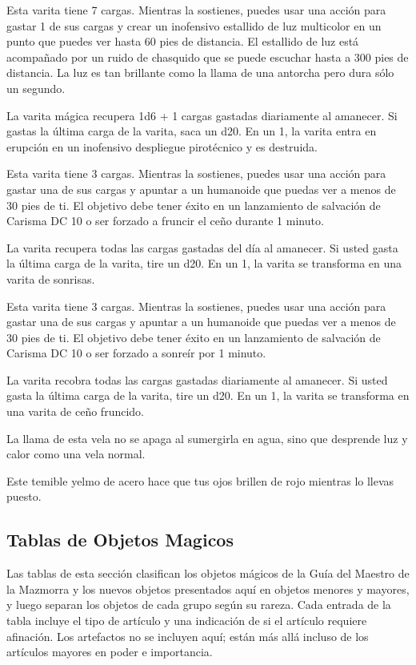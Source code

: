 \documentclass[a4paper,twocolumn,openany,10pt]{dndbook}
\begin{document}
Esta varita tiene 7 cargas. Mientras la sostienes, puedes usar una acción para gastar 1 de sus cargas y crear un inofensivo
estallido de luz multicolor en un punto que puedes ver hasta 60 pies de distancia. El estallido de luz está acompañado por un
ruido de chasquido que se puede escuchar hasta a 300 pies de distancia. La luz es tan brillante como la llama de una antorcha
pero dura sólo un segundo.

La varita mágica recupera 1d6 + 1 cargas gastadas diariamente al amanecer. Si gastas la última carga de la varita, saca un d20.
En un 1, la varita entra en erupción en un inofensivo despliegue pirotécnico y es destruida.

Esta varita tiene 3 cargas. Mientras la sostienes, puedes usar una acción para gastar una de sus cargas y apuntar a un humanoide
que puedas ver a menos de 30 pies de ti. El objetivo debe tener éxito en un lanzamiento de salvación de Carisma DC 10 o ser
forzado a fruncir el ceño durante 1 minuto.

La varita recupera todas las cargas gastadas del día al amanecer. Si usted gasta la última carga de la varita, tire un d20. En
un 1, la varita se transforma en una varita de sonrisas.

Esta varita tiene 3 cargas. Mientras la sostienes, puedes usar una acción para gastar una de sus cargas y apuntar a un humanoide
que puedas ver a menos de 30 pies de ti. El objetivo debe tener éxito en un lanzamiento de salvación de Carisma DC 10 o ser
forzado a sonreír por 1 minuto.

La varita recobra todas las cargas gastadas diariamente al amanecer. Si usted gasta la última carga de la varita, tire un d20.
En un 1, la varita se transforma en una varita de ceño fruncido. 

La llama de esta vela no se apaga al sumergirla en agua, sino que desprende luz y calor como una vela normal. 

Este temible yelmo de acero hace que tus ojos brillen de rojo mientras lo llevas puesto.


\subsection{Tablas de Objetos Magicos}
Las tablas de esta sección clasifican los objetos mágicos de la Guía del Maestro de la Mazmorra y los nuevos objetos presentados
aquí en objetos menores y mayores, y luego separan los objetos de cada grupo según su rareza. Cada entrada de la tabla incluye
el tipo de artículo y una indicación de si el artículo requiere afinación. Los artefactos no se incluyen aquí; están más allá
incluso de los artículos mayores en poder e importancia. 
\end{document}
